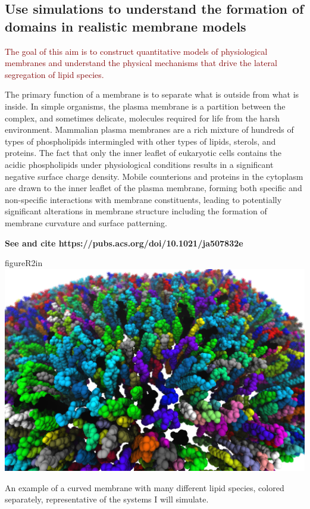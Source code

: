 \documentclass[11pt,notitlepage]{article}
\begin{document}
\hypertarget{use-simulations-to-understand-the-formation-of-domains-in-realistic-membrane-models}{%
\subsection{Use simulations to understand the formation of domains in
realistic membrane
models}\label{use-simulations-to-understand-the-formation-of-domains-in-realistic-membrane-models}}

\textcolor{Maroon}{The goal of this aim is to construct quantitative models of physiological membranes and understand the physical mechanisms that drive the lateral segregation of lipid species.}

The primary function of a membrane is to separate what is outside from
what is inside. In simple organisms, the plasma membrane is a partition
between the complex, and sometimes delicate, molecules required for life
from the harsh environment. Mammalian plasma membranes are a rich
mixture of hundreds of types of phospholipids intermingled with other
types of lipids, sterols, and proteins. The fact that only the inner
leaflet of eukaryotic cells contains the acidic phospholipids under
physiological conditions results in a significant negative surface
charge density. Mobile counterions and proteins in the cytoplasm are
drawn to the inner leaflet of the plasma membrane, forming both specific
and non-specific interactions with membrane constituents, leading to
potentially significant alterations in membrane structure including the
formation of membrane curvature and surface patterning.

\textbf{See and cite https://pubs.acs.org/doi/10.1021/ja507832e }


\begin{wrapfloat}{figure}{R}{2in}
\centering
\includegraphics{content/images/membrane-vmd.png}
\caption{An example of a curved membrane with many different lipid
species, colored separately, representative of the systems I will
simulate.}
\label{fig:membrane-setup}
\end{wrapfloat}
\end{document}
